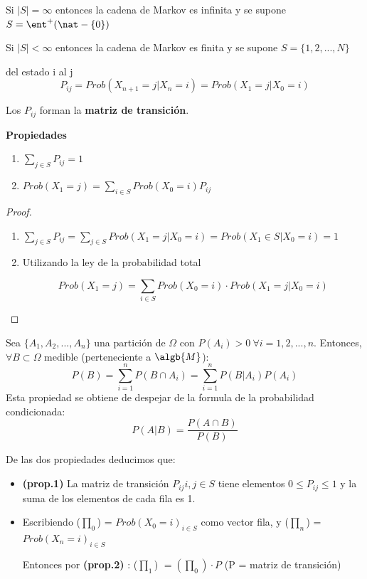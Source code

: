 Si $|S| = \infty$ entonces la cadena de Markov es infinita y se supone $S = \ent^+ (\nat -\{0\})$


Si $|S| < \infty$ entonces la cadena de Markov es finita y se supone $S =\{1,2,...,N\}$

\begin{defn}
	del estado i al j
	$$P_{ij} = Prob(X_{n+1} = j| X_n = i) = Prob (X_1 = j| X_0 = i)$$
\end{defn}

Los $P_{ij}$ forman la \textbf{matriz de transición}.

\newpage
\textbf{Propiedades}
\begin{enumerate}
	\item $\sum_{j \in S} P_{ij} = 1$
	\item $Prob(X_1 = j)= \sum_{i \in S} Prob(X_0 = i)P_{ij}$\\
\end{enumerate}

\begin{proof}
	\begin{enumerate}
		\item $\sum_{j \in S} P_{ij} = \sum_{j\in S} Prob(X_1 = j | X_0 = i) = Prob (X_1 \in S | X_0 = i) = 1$
		\item Utilizando la ley de la probabilidad total

		$$Prob(X_1 = j) = \sum_{i \in S} Prob (X_0 = i) \cdot Prob(X_1 = j| X_0 = i)$$
	\end{enumerate}
\end{proof}

	\begin{defn}
		Sea  $\{A_1, A_2,...,A_n\}$ una partición de $\Omega$ con $P(A_i)>0 \ \forall i=1,2,...,n$. Entonces, $\forall B \subset \Omega$ medible (perteneciente a $\algb{M}$):
		\[
		P(B)=\sum_{i=1}^{n}P(B\cap A_i)=\sum_{i=1}^{n}P(B|A_i)P(A_i)
		\]
		Esta propiedad se obtiene de despejar de la formula de la probabilidad condicionada:
		\[P(A|B)=\frac{P(A \cap B)}{P(B)}\]
	\end{defn}


De las dos propiedades deducimos que:
\begin{itemize}
	\item \textbf{(prop.1)} La matriz de transición $P_{ij} i,j \in S$ tiene elementos $0 \leq P_{ij} \leq 1$ y la suma de los elementos de cada fila es 1.
	\item Escribiendo ($\prod_0$) = ${Prob (X_0 =i)}_{i \in S}$ como vector fila, y ($\prod_n$) = ${Prob (X_n =i)}_{i \in S}$

	Entonces por \textbf{(prop.2)} : ($\prod_1$) $ = (\prod_0)\cdot P$ (P = matriz de transición)
\end{itemize}

